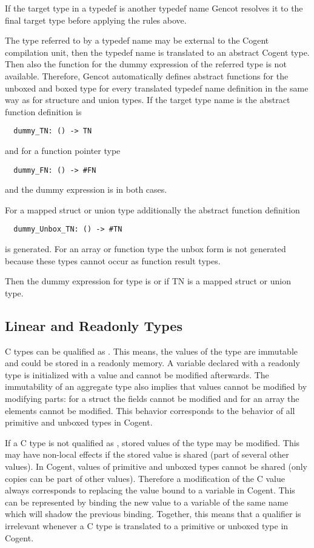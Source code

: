 If the target type in a typedef is another typedef name Gencot resolves it to the final target type
before applying the rules above.

The type referred to by a typedef name may be external to the Cogent compilation unit, then the typedef name
is translated to an abstract Cogent type. Then also the function for the dummy expression of the referred
type is not available. Therefore, Gencot automatically defines abstract functions for the unboxed and 
boxed type for every translated typedef name definition in the same way as for structure and union types.
If the target type name is  the abstract function definition is
\begin{verbatim}
  dummy_TN: () -> TN
\end{verbatim}
and for a function pointer type 
\begin{verbatim}
  dummy_FN: () -> #FN
\end{verbatim}
and the dummy expression is  in both cases.

For a mapped struct or union type additionally the abstract function definition
\begin{verbatim}
  dummy_Unbox_TN: () -> #TN
\end{verbatim}
is generated. For an array or function type the unbox form is not generated because these types cannot occur
as function result types.

Then the dummy expression for type  is  or  if 
TN is a mapped struct or union type.

\subsection{Linear and Readonly Types}
\label{design-types-readonly}

C types can be qualified as . This means, the values of the type are immutable and could be stored in 
a readonly memory. A variable declared with a readonly type is initialized with a value and cannot be modified 
afterwards. The immutability of an aggregate type also implies that values cannot be modified by modifying parts: 
for a struct the fields cannot be modified and for an array the elements cannot be modified. This behavior corresponds 
to the behavior of all primitive and unboxed types in Cogent. 

If a C type is not qualified as , stored values of the type may be modified. This may have non-local
effects if the stored value is shared (part of several other values). In Cogent, values of primitive and unboxed types
cannot be shared (only copies can be part of other values). Therefore a modification of the C value always corresponds to
replacing the value bound to a variable in Cogent. This can be represented by binding the new value to a variable
of the same name which will shadow the previous binding. Together, this means that a  qualifier is
irrelevant whenever a C type is translated to a primitive or unboxed type in Cogent.

